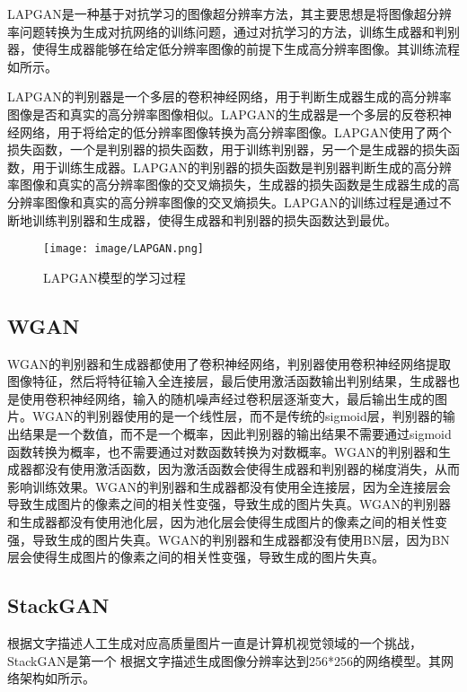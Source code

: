 \documentclass[lang=cn,a4paper,12pt,bibend=biber]{GAN}
\begin{document}
LAPGAN是一种基于对抗学习的图像超分辨率方法，其主要思想是将图像超分辨率问题转换为生成对抗网络的训练问题，通过对抗学习的方法，训练生成器和判别器，使得生成器能够在给定低分辨率图像的前提下生成高分辨率图像。其训练流程如所示。

LAPGAN的判别器是一个多层的卷积神经网络，用于判断生成器生成的高分辨率图像是否和真实的高分辨率图像相似。LAPGAN的生成器是一个多层的反卷积神经网络，用于将给定的低分辨率图像转换为高分辨率图像。LAPGAN使用了两个损失函数，一个是判别器的损失函数，用于训练判别器，另一个是生成器的损失函数，用于训练生成器。LAPGAN的判别器的损失函数是判别器判断生成的高分辨率图像和真实的高分辨率图像的交叉熵损失，生成器的损失函数是生成器生成的高分辨率图像和真实的高分辨率图像的交叉熵损失。LAPGAN的训练过程是通过不断地训练判别器和生成器，使得生成器和判别器的损失函数达到最优。

\begin{figure}[!htbp]
  \centering
  \texttt{[image: image/LAPGAN.png]}
  \caption[]{LAPGAN模型的学习过程}
  \label{fig:LAPGAN模型的学习过程}
\end{figure}


\subsection{WGAN}
WGAN的判别器和生成器都使用了卷积神经网络，判别器使用卷积神经网络提取图像特征，然后将特征输入全连接层，最后使用激活函数输出判别结果，生成器也是使用卷积神经网络，输入的随机噪声经过卷积层逐渐变大，最后输出生成的图片。WGAN的判别器使用的是一个线性层，而不是传统的sigmoid层，判别器的输出结果是一个数值，而不是一个概率，因此判别器的输出结果不需要通过sigmoid函数转换为概率，也不需要通过对数函数转换为对数概率。WGAN的判别器和生成器都没有使用激活函数，因为激活函数会使得生成器和判别器的梯度消失，从而影响训练效果。WGAN的判别器和生成器都没有使用全连接层，因为全连接层会导致生成图片的像素之间的相关性变强，导致生成的图片失真。WGAN的判别器和生成器都没有使用池化层，因为池化层会使得生成图片的像素之间的相关性变强，导致生成的图片失真。WGAN的判别器和生成器都没有使用BN层，因为BN层会使得生成图片的像素之间的相关性变强，导致生成的图片失真。

\subsection{StackGAN}

根据文字描述人工生成对应高质量图片一直是计算机视觉领域的一个挑战，StackGAN是第一个
根据文字描述生成图像分辨率达到256*256的网络模型。其网络架构如所示。
\end{document}
